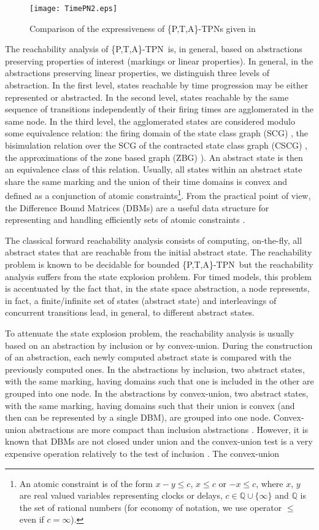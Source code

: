 \documentclass[submission,copyright,creativecommons]{eptcs}
\numberwithin{equation}{section}
\def\ttappn{\{P,T,A\}-TPN}
\begin{document}
\begin{figure}[ht!]
\centering
\texttt{[image: TimePN2.eps]}
\caption{Comparison of the expressiveness of \{P,T,A\}-TPNs given in \cite{boyer-FI-08}}
\label{fig:Exemple}       \end{figure}
The reachability analysis of \ttappn~is, in general, based on abstractions preserving properties of interest (markings or linear properties). In general, in the abstractions preserving linear properties, we distinguish three levels of abstraction. In the first level, states reachable by time progression may be
either represented or abstracted. In the second level, states reachable by
the same sequence of transitions independently of their firing times are
agglomerated in the same node. In the third level, the
agglomerated states are considered modulo some equivalence relation:
 the firing domain of the state class graph (SCG) \cite{BVer03}, the
bisimulation relation over the SCG of the contracted state class graph (CSCG) \cite{acsd07}, the approximations of the zone based graph (ZBG) \cite{Bou09}). An abstract state is then an equivalence class of this relation. Usually, all states within an abstract state share the same marking and the union of their time domains is convex and defined as a conjunction of atomic constraints\footnote{An atomic constraint is of the form $x-y \leq c$, $x \leq c$ or $-x \leq c$, where $x$, $y$ are real valued variables representing clocks or delays, $c \in \mathbb{Q} \cup \{\infty\}$ and $\mathbb{Q}$ is the set of rational numbers (for economy of notation, we use operator $\leq$ even if
$c=\infty$).}. From the practical point of view, the Difference Bound Matrices (DBMs) are a useful data structure for representing and handling efficiently sets of atomic constraints \cite{Bouyer06}.
\par The classical forward reachability analysis consists of computing, on-the-fly, all abstract states that are reachable from the initial abstract state. The reachability problem is known to be decidable for bounded \ttappn~but the reachability analysis suffers from the state explosion problem. For timed models, this problem is accentuated by the fact that, in the state space abstraction, a node represents, in fact, a finite/infinite set of states (abstract state) and interleavings of concurrent transitions lead, in general, to different abstract states.
\par To attenuate the state explosion problem, the reachability analysis is usually based on an abstraction by inclusion or by convex-union. During the construction of an abstraction, each newly computed abstract state is compared with the previously computed ones. In the abstractions by inclusion, two abstract states, with the same marking, having domains such that one is included in the other are grouped into one node. In the abstractions by convex-union, two abstract states, with the same marking, having domains such that their union is convex (and then can be represented by a single DBM), are grouped into one node. Convex-union abstractions are more compact than inclusion abstractions \cite{HadjBouc-STTT-08}. However, it is known that DBMs are not closed under union and the convex-union test is a very expensive operation relatively to the test of inclusion \cite{HadjBouc-STTT-08}. The convex-union
\end{document}

